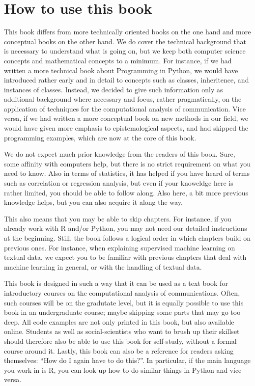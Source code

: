 
\section{How to use this book}

This book differs from more technically oriented books on the one hand
and more conceptual books on the other hand. We do cover the technical
background that is necessary to understand what is going on, but we
keep both computer science concepts and mathematical concepts to a
minimum. For instance, if we had written a more technical book about
Programming in Python, we would have introduced rather early and in
detail to concepts such as classes, inheritence, and instances of
classes. Instead, we decided to give such information only as
additional background where necessary and focus, rather pragmatically,
on the application of techniques for the computational analysis of
communication. Vice versa, if we had written a more conceptual book on
new methods in our field, we would have given more emphasis to
epistemological aspects, and had skipped the programming examples,
which are now at the core of this book.

We do not expect much prior knowledge from the readers of this
book. Sure, some affinity with computers help, but there is no strict
requirement on what you need to know. Also in terms of statistics, it
has helped if you have heard of terms such as correlation or
regression analysis, but even if your knoweldge here is rather
limited, you should be able to follow along. Also here, a bit more
previous knowledge helps, but you can also acquire it along the way.

This also means that you may be able to skip chapters. For instance,
if you already work with R and/or Python, you may not need our
detailed instructions at the beginning. Still, the book follows a
logical order in which chapters build on previous ones. For instance,
when explaining supervised machine learning on textual data, we expect
you to be familiar with previous chapters that deal with machine
learning in general, or with the handling of textual data.

This book is designed in such a way that it can be used as a text book
for introductory courses on the computational analysis of
communications. Often, such courses will be on the gradutate level,
but it is equally possible to use this book in an undergraduate
course; maybe skipping some parts that may go too deep. All code
examples are not only printed in this book, but also available
online. Students as well as social-scientists who want to brush up
their skillset should therefore also be able to use this book for
self-study, without a formal course around it. Lastly, this book can
also be a reference for readers asking themselves: ``How do I again
have to do this?''. In particular, if the main language you work in is
R, you can look up how to do similar things in Python and vice versa.

